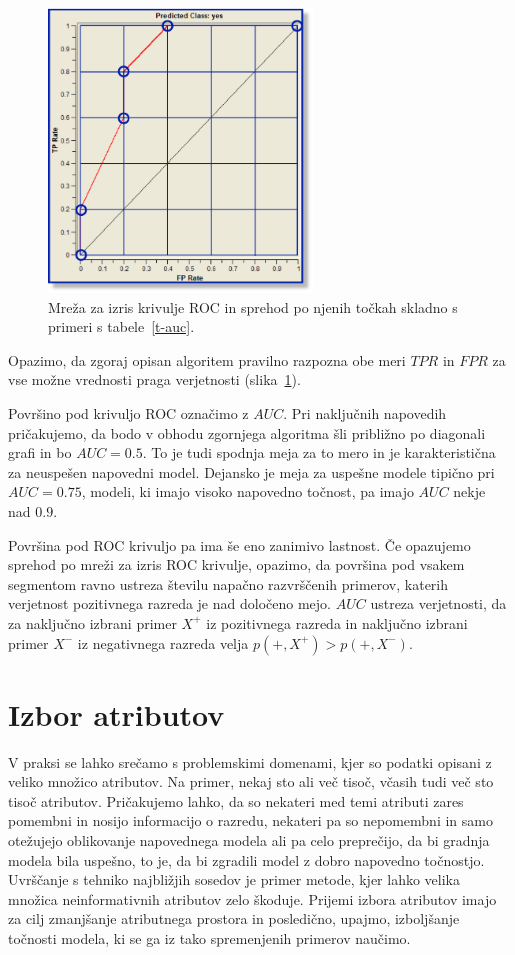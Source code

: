\begin{figure}[htbp]
\begin{center}
\includegraphics[width=7cm]{slike/roc-walk.pdf}
\caption{Mreža za izris krivulje ROC in sprehod po njenih točkah skladno s primeri s tabele~\ref{t-auc}.}
\label{f-roc-walk}
\end{center}
\end{figure}

Opazimo, da zgoraj opisan algoritem pravilno razpozna obe meri $TPR$ in $FPR$ za vse možne vrednosti praga verjetnosti (slika~\ref{f-roc-walk}).

Površino pod krivuljo ROC označimo z $AUC$. Pri naključnih napovedih pričakujemo, da bodo v obhodu zgornjega algoritma šli približno po diagonali grafi in bo $AUC=0.5$. To je tudi spodnja meja za to mero in je karakteristična za neuspešen napovedni model. Dejansko je meja za uspešne modele tipično pri $AUC=0.75$, modeli, ki imajo visoko napovedno točnost, pa imajo $AUC$ nekje nad $0.9$.

Površina pod ROC krivuljo pa ima še eno zanimivo lastnost. Če opazujemo sprehod po mreži za izris ROC krivulje, opazimo, da površina pod vsakem segmentom ravno ustreza številu napačno razvrščenih primerov, katerih verjetnost pozitivnega razreda je nad določeno mejo. $AUC$ ustreza verjetnosti, da za naključno izbrani primer $X^+$ iz pozitivnega razreda in naključno izbrani primer $X^-$ iz negativnega razreda velja $p(+,X^+) > p(+, X^-)$.

\section{Izbor atributov}

V praksi se lahko srečamo s problemskimi domenami, kjer so podatki opisani z veliko množico atributov. Na primer, nekaj sto ali več tisoč, včasih tudi več sto tisoč atributov. Pričakujemo lahko, da so nekateri med temi atributi zares pomembni in nosijo informacijo o razredu, nekateri pa so nepomembni in samo otežujejo oblikovanje napovednega modela ali pa celo preprečijo, da bi gradnja modela bila uspešno, to je, da bi zgradili model z dobro napovedno točnostjo. Uvrščanje s tehniko najbližjih sosedov je primer metode, kjer lahko velika množica neinformativnih atributov zelo škoduje. Prijemi izbora atributov imajo za cilj zmanjšanje atributnega prostora in posledično, upajmo, izboljšanje točnosti modela, ki se ga iz tako spremenjenih primerov naučimo.

